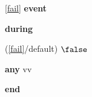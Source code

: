 \noindent \ref{fail}  \textbf{event}
\begin{block}
  \item   \textbf{during}
  \begin{block}
  \item[ (\ref{fail}/default) ]{$\false $} %
  \end{block}
  \item   \textbf{any} vv
  \item   \textbf{end} \\
\end{block}
